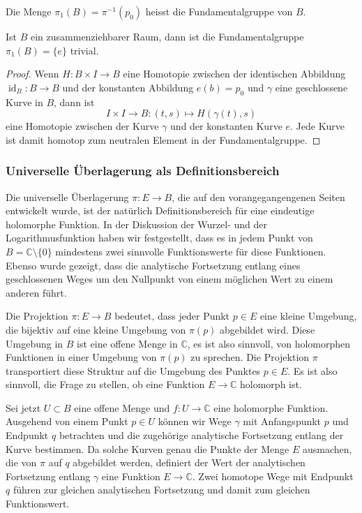 \begin{definition}[Fundamentalgruppe]
Die Menge $\pi_1(B)=\pi^{-1}(p_0)$ heisst die Fundamentalgruppe von $B$.
\end{definition}

\begin{satz}
Ist $B$ ein zusammenziehbarer Raum, dann ist die Fundamentalgruppe
$\pi_1(B)=\{e\}$ trivial.
\end{satz}

\begin{proof}
Wenn $H\colon B\times I\to B$ eine Homotopie zwischen der identischen
Abbildung $\operatorname{id}_B\colon B\to B$ und der konstanten Abbildung
$e(b) = p_0$ und $\gamma$ eine geschlossene Kurve in $B$, dann ist
\[
I\times I
\to
B
:
(t,s)
\mapsto
H(\gamma(t),s)
\]
eine Homotopie zwischen der Kurve $\gamma$ und der konstanten Kurve $e$.
Jede Kurve ist damit homotop zum neutralen Element in der Fundamentalgruppe.
\end{proof}

%
%
\subsubsection{Universelle Überlagerung als Definitionsbereich}
Die universelle Überlagerung $\pi\colon E \to B$, die auf den
vorangegangengenen Seiten entwickelt wurde, ist der natürlich
Definitionsbereich für eine eindeutige holomorphe Funktion.
In der Diskussion der Wurzel- und der Logarithmusfunktion haben
wir festgestellt, dass es in jedem Punkt von $B=\mathbb{C}\setminus\{0\}$
mindestens zwei sinnvolle Funktionswerte für diese Funktionen.
Ebenso wurde gezeigt, dass die analytische Fortsetzung entlang
eines geschlossenen Weges um den Nullpunkt von einem möglichen
Wert zu einem anderen führt.

Die Projektion $\pi\colon E\to B$ bedeutet, dass jeder Punkt $p\in E$
eine kleine Umgebung, die bijektiv auf eine kleine Umgebung von $\pi(p)$
abgebildet wird.
Diese Umgebung in $B$ ist eine offene Menge in $\mathbb{C}$, es ist also
sinnvoll, von holomorphen Funktionen in einer Umgebung von $\pi(p)$ zu 
sprechen.
Die Projektion $\pi$ transportiert diese Struktur auf die Umgebung
des Punktes $p\in E$.
Es ist also sinnvoll, die Frage zu stellen, ob eine Funktion
$E\to \mathbb{C}$ holomorph ist.

Sei jetzt $U\subset B$ eine offene Menge und $f\colon U\to\mathbb{C}$
eine holomorphe Funktion.
Ausgehend von einem Punkt $p\in U$ können wir Wege $\gamma$ mit
Anfangspunkt $p$ und Endpunkt $q$ betrachten und die zugehörige
analytische Fortsetzung entlang der Kurve bestimmen.
Da solche Kurven genau die Punkte der Menge $E$ ausmachen, die
von $\pi$ auf $q$ abgebildet werden, definiert der Wert der
analytischen Fortsetzung entlang $\gamma$ eine Funktion $E\to \mathbb{C}$.
Zwei homotope Wege mit Endpunkt $q$ führen zur gleichen 
analytischen Fortsetzung und damit zum gleichen Funktionswert.

